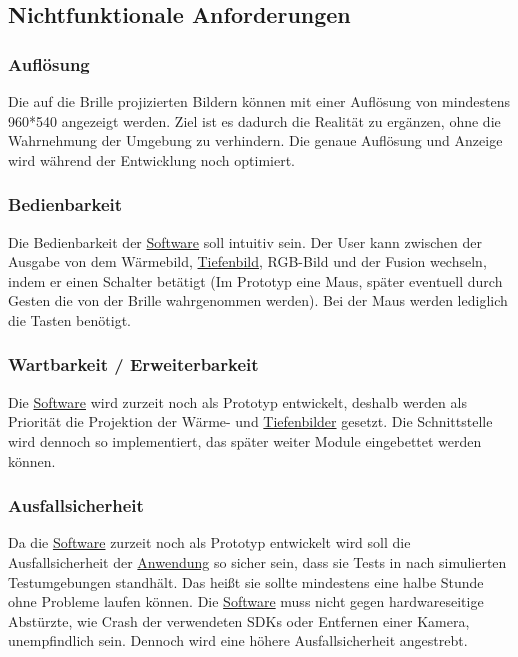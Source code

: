 \subsection{Nichtfunktionale Anforderungen}

\subsubsection{Auflösung}
Die auf die Brille projizierten Bildern können mit einer  Auflösung von mindestens 960*540 angezeigt werden.
Ziel ist es dadurch die Realität zu ergänzen, ohne die Wahrnehmung der Umgebung zu verhindern.
Die genaue Auflösung und Anzeige wird während der Entwicklung noch optimiert.

\subsubsection{Bedienbarkeit}
Die Bedienbarkeit der \hyperlink{tab:anwendung}{Software} soll intuitiv sein.
Der User kann zwischen der Ausgabe von dem Wärmebild, \hyperlink{tab:tiefe}{Tiefenbild}, RGB-Bild und der Fusion wechseln, indem er einen Schalter betätigt (Im Prototyp eine Maus, später eventuell durch Gesten die von der Brille wahrgenommen werden).
Bei der Maus werden lediglich die Tasten benötigt.

\subsubsection{Wartbarkeit / Erweiterbarkeit}
Die \hyperlink{tab:anwendung}{Software} wird zurzeit noch als Prototyp entwickelt, deshalb werden als Priorität die Projektion der Wärme- und \hyperlink{tab:tiefe}{Tiefenbilder} gesetzt.
Die Schnittstelle wird dennoch so implementiert, das später weiter Module eingebettet werden können.

\subsubsection{Ausfallsicherheit}
Da die \hyperlink{tab:anwendung}{Software} zurzeit noch als Prototyp entwickelt wird soll die Ausfallsicherheit der \hyperlink{tab:anwendung}{Anwendung} so sicher sein, dass sie Tests in nach simulierten Testumgebungen standhält.
Das heißt sie sollte mindestens eine halbe Stunde ohne Probleme laufen können.
Die  \hyperlink{tab:anwendung}{Software} muss nicht gegen hardwareseitige Abstürzte, wie Crash der verwendeten SDKs oder Entfernen einer Kamera, unempfindlich sein.
Dennoch wird eine höhere Ausfallsicherheit angestrebt.

